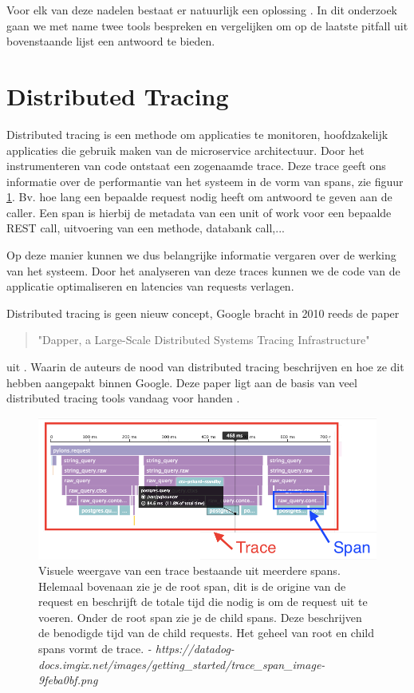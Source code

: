 Voor elk van deze nadelen bestaat er natuurlijk een oplossing \autocite{Hummel2018}. In dit onderzoek gaan we met name twee tools bespreken en vergelijken om op de laatste pitfall uit bovenstaande lijst een antwoord te bieden.

\section{Distributed Tracing}
Distributed tracing is een methode om applicaties te monitoren, hoofdzakelijk applicaties die gebruik maken van de microservice architectuur. Door het instrumenteren van code ontstaat een zogenaamde trace. Deze trace geeft ons informatie over de performantie van het systeem in de vorm van spans, zie figuur \ref{fig:trace}. Bv. hoe lang een bepaalde request nodig heeft om antwoord te geven aan de caller. Een span is hierbij de metadata van een unit of work voor een bepaalde \gls{REST} call, uitvoering van een methode, databank call,...

Op deze manier kunnen we dus belangrijke informatie vergaren over de werking van het systeem. Door het analyseren van deze traces kunnen we de code van de applicatie optimaliseren en \gls{latencies} van requests verlagen.

Distributed tracing is geen nieuw concept, Google bracht in 2010 reeds de paper \begin{quotation}
	"Dapper, a Large-Scale Distributed Systems Tracing Infrastructure"
\end{quotation} uit \autocite{36356}. Waarin de auteurs de nood van distributed tracing beschrijven en hoe ze dit hebben aangepakt binnen Google. Deze paper ligt aan de basis van veel distributed tracing tools vandaag voor handen \autocite{Mace2017}.

\begin{figure}
	\includegraphics[width=\linewidth]{img/trace_span.png}
	\caption{Visuele weergave van een trace bestaande uit meerdere spans. Helemaal bovenaan zie je de root span, dit is de origine van de request en beschrijft de totale tijd die nodig is om de request uit te voeren.  Onder de root span zie je de child spans. Deze beschrijven de benodigde tijd van de child requests. Het geheel van root en child spans vormt de trace. \textit{- https://datadog-docs.imgix.net/images/getting\_started/trace\_span\_image-9feba0bf.png}}
	\label{fig:trace}
\end{figure}

